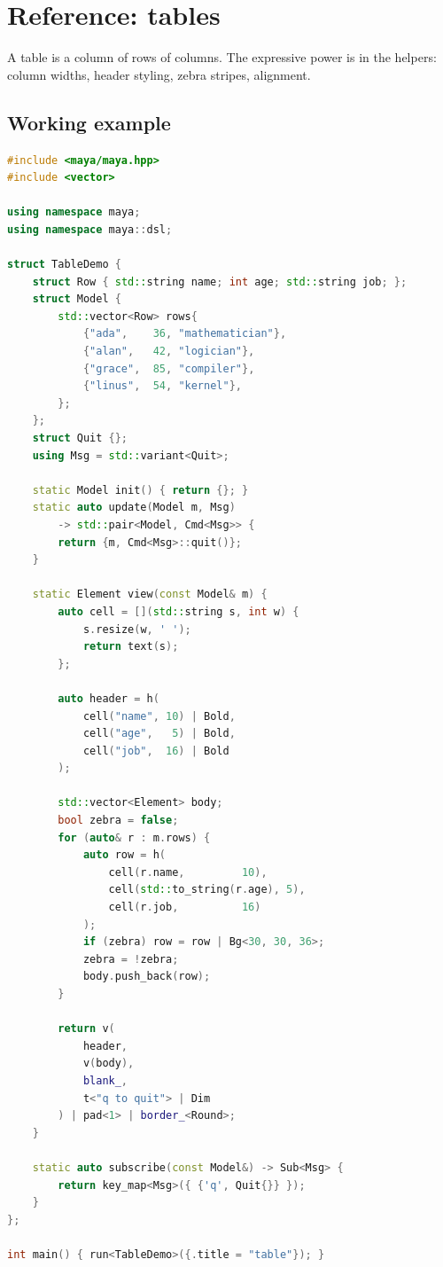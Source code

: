 \chapter{Reference: tables}
\label{ch:refman-table}

\begin{aside}
A table is a column of rows of columns. The expressive power
is in the helpers: column widths, header styling, zebra
stripes, alignment.
\end{aside}

\section{Working example}

\begin{lstlisting}[language=C++]
#include <maya/maya.hpp>
#include <vector>

using namespace maya;
using namespace maya::dsl;

struct TableDemo {
    struct Row { std::string name; int age; std::string job; };
    struct Model {
        std::vector<Row> rows{
            {"ada",    36, "mathematician"},
            {"alan",   42, "logician"},
            {"grace",  85, "compiler"},
            {"linus",  54, "kernel"},
        };
    };
    struct Quit {};
    using Msg = std::variant<Quit>;

    static Model init() { return {}; }
    static auto update(Model m, Msg)
        -> std::pair<Model, Cmd<Msg>> {
        return {m, Cmd<Msg>::quit()};
    }

    static Element view(const Model& m) {
        auto cell = [](std::string s, int w) {
            s.resize(w, ' ');
            return text(s);
        };

        auto header = h(
            cell("name", 10) | Bold,
            cell("age",   5) | Bold,
            cell("job",  16) | Bold
        );

        std::vector<Element> body;
        bool zebra = false;
        for (auto& r : m.rows) {
            auto row = h(
                cell(r.name,         10),
                cell(std::to_string(r.age), 5),
                cell(r.job,          16)
            );
            if (zebra) row = row | Bg<30, 30, 36>;
            zebra = !zebra;
            body.push_back(row);
        }

        return v(
            header,
            v(body),
            blank_,
            t<"q to quit"> | Dim
        ) | pad<1> | border_<Round>;
    }

    static auto subscribe(const Model&) -> Sub<Msg> {
        return key_map<Msg>({ {'q', Quit{}} });
    }
};

int main() { run<TableDemo>({.title = "table"}); }
\end{lstlisting}

